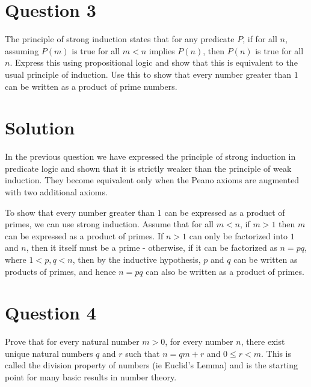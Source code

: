 \documentclass[12pt]{report}
\begin{document}
\section*{Question 3}
The principle of strong induction states that for any predicate $P$, if for all $n$, assuming $P(m)$ is true for all $m < n$ implies $P(n)$, then $P(n)$ is true for all $n$. Express this using propositional logic and show that this is equivalent to the usual principle of induction. Use this to show that every number greater than $1$ can be written as a product of prime numbers.
\section*{Solution}
In the previous question we have expressed the principle of strong induction in predicate logic and shown that it is strictly weaker than the principle of weak induction. They become equivalent only when the Peano axioms are augmented with two additional axioms. 

To show that every number greater than $1$ can be expressed as a product of primes, we can use strong induction. Assume that for all $m < n$, if $m > 1$ then $m$ can be expressed as a product of primes. If $n > 1$ can only be factorized into $1$ and $n$, then it itself must be a prime - otherwise, if it can be factorized as $n = pq$, where $1 < p, q < n$, then by the inductive hypothesis, $p$ and $q$ can be written as products of primes, and hence $n = pq$ can also be written as a product of primes. 
\section*{Question 4}
Prove that for every natural number $m > 0$, for every number $n$, there exist unique natural numbers $q$ and $r$ such that $n = qm + r$ and $0 \leq r < m$. This
is called the division property of numbers (ie Euclid's Lemma) and is the starting point for many basic results in number theory.
\end{document}
